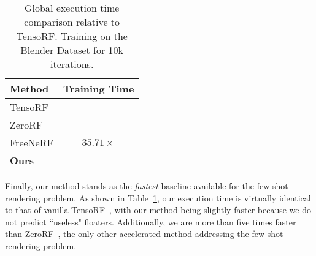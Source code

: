 \begin{table}[t]
	\centering
    \vspace{-0.5em}
	\caption{Global execution time comparison relative to TensoRF. Training on the Blender Dataset for 10k iterations.}
	\label{tab:execution_time_comparison}
	\begin{tabular}{lc}
		\toprule
		Method & Training Time \\
		\midrule
		TensoRF \cite{Chen2022ECCV} & \cellcolor{orange!25}{$1.0 \times$}\\
		ZeroRF \cite{shi2024zerorf} &  \cellcolor{yellow!25}{$5.181 \times$}\\ %
		FreeNeRF \cite{yang2023freenerf} &  $35.71 \times$ \\%
		\textbf{Ours} & \cellcolor{red!25}{$0.93 \times$} \\
		\bottomrule
	\end{tabular}
    \vspace{-1em}
\end{table}

Finally, our method stands as the \textit{fastest} baseline available for the few-shot rendering problem. As shown in Table~\ref{tab:execution_time_comparison}, our execution time is virtually identical to that of vanilla TensoRF~\cite{Chen2022ECCV}, with our method being slightly faster because we do not predict ``useless" floaters. Additionally, we are more than five times faster than ZeroRF~\cite{shi2024zerorf}, the only other accelerated method addressing the few-shot rendering problem.




